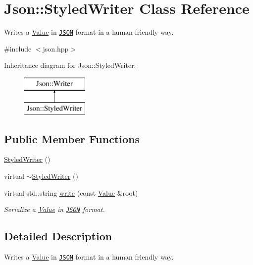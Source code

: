 \hypertarget{class_json_1_1_styled_writer}{\section{Json\-:\-:Styled\-Writer Class Reference}
\label{class_json_1_1_styled_writer}
}


Writes a \hyperlink{class_json_1_1_value}{Value} in \href{http://www.json.org}{\tt J\-S\-O\-N} format in a human friendly way.  




{\ttfamily \#include $<$json.\-hpp$>$}

Inheritance diagram for Json\-:\-:Styled\-Writer\-:\begin{figure}[H]
\begin{center}
\leavevmode
\includegraphics[height=2.000000cm]{class_json_1_1_styled_writer}
\end{center}
\end{figure}
\subsection*{Public Member Functions}
\begin{DoxyCompactItemize}
\item 
\hyperlink{class_json_1_1_styled_writer_a1f1b5f922a6a0ef0e56c6dd2f6170192}{Styled\-Writer} ()
\item 
virtual \hyperlink{class_json_1_1_styled_writer_a7eb58eabb70c6b80ac1ccec93c0c8602}{$\sim$\-Styled\-Writer} ()
\item 
virtual std\-::string \hyperlink{class_json_1_1_styled_writer_a56f0fd80f60272b3f3c85690aae66e7d}{write} (const \hyperlink{class_json_1_1_value}{Value} \&root)
\begin{DoxyCompactList}\small\item\em Serialize a \hyperlink{class_json_1_1_value}{Value} in \href{http://www.json.org}{\tt J\-S\-O\-N} format. \end{DoxyCompactList}\end{DoxyCompactItemize}


\subsection{Detailed Description}
Writes a \hyperlink{class_json_1_1_value}{Value} in \href{http://www.json.org}{\tt J\-S\-O\-N} format in a human friendly way. 

